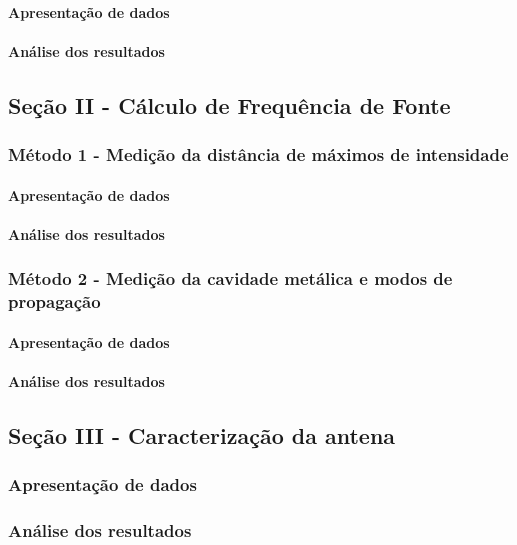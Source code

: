 \documentclass[12pt]{article}
\begin{document}
\paragraph{Apresentação de dados}
\paragraph{Análise dos resultados}

\subsection{Seção II - Cálculo de Frequência de Fonte}
\subsubsection{Método 1 - Medição da distância de máximos de intensidade}
\paragraph{Apresentação de dados}
\paragraph{Análise dos resultados}

\subsubsection{Método 2 - Medição da cavidade metálica e modos de propagação}
\paragraph{Apresentação de dados}
\paragraph{Análise dos resultados}

\subsection{Seção III - Caracterização da antena}
\subsubsection{Apresentação de dados}
\subsubsection{Análise dos resultados}
\end{document}
